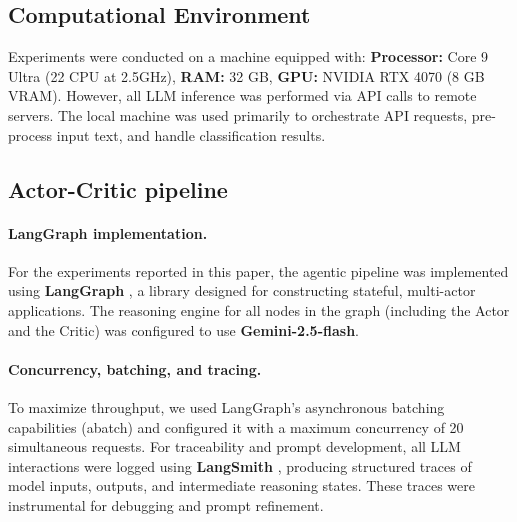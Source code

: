 \subsection{Computational Environment}

Experiments were conducted on a machine equipped with: \textbf{Processor:} Core 9 Ultra (22 CPU at 2.5GHz), \textbf{RAM:} 32 GB, \textbf{GPU:} NVIDIA RTX 4070 (8 GB VRAM). However, all LLM inference was performed via API calls to remote servers. The local machine was used primarily to orchestrate API requests, pre-process input text, and handle classification results.

\subsection{Actor-Critic pipeline}

\paragraph{LangGraph implementation.}
For the experiments reported in this paper, the agentic pipeline was implemented using \textbf{LangGraph} \cite{langgraph2024}, a library designed for constructing stateful, multi-actor applications. The reasoning engine for all nodes in the graph (including the Actor and the Critic) was configured to use \textbf{Gemini-2.5-flash}.

\paragraph{Concurrency, batching, and tracing.}
To maximize throughput, we used LangGraph's asynchronous batching capabilities (abatch) and configured it with a maximum concurrency of 20 simultaneous requests. For traceability and prompt development, all LLM interactions were logged using \textbf{LangSmith} \cite{langsmith2024}, producing structured traces of model inputs, outputs, and intermediate reasoning states. These traces were instrumental for debugging and prompt refinement.

